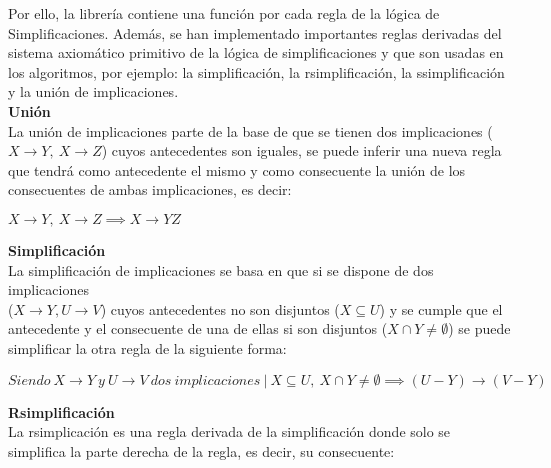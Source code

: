 


Por ello, la librer\'ia contiene una funci\'on por cada regla de la l\'ogica de Simplificaciones. Adem\'as, se han implementado importantes reglas derivadas del sistema axiom\'atico primitivo de la l\'ogica de simplificaciones y que son usadas en los algoritmos, por ejemplo: la simplificaci\'on, la rsimplificaci\'on, la ssimplificaci\'on y la uni\'on de implicaciones.\\

\textbf{Uni\'on}\\
La uni\'on de implicaciones parte de la base de que se tienen dos implicaciones (\(X \to Y, \ X \to Z\)) cuyos antecedentes son iguales, se puede inferir una nueva regla que tendr\'a como antecedente el mismo y como consecuente la uni\'on de los consecuentes de ambas implicaciones, es decir:

\begin{center}
    \(X \to Y, \ X \to Z \implies X \to YZ \)
\end{center}


\bigskip
\textbf{Simplificaci\'on}\\
La simplificaci\'on de implicaciones se basa en que si se dispone de dos implicaciones \\ (\(X \to Y , U \to V\)) cuyos antecedentes no son disjuntos (\(X \subseteq U\)) y se cumple que el antecedente y el consecuente de una de ellas si son disjuntos (\(X \cap Y \neq \emptyset\)) se puede simplificar la otra regla de la siguiente forma:

\begin{center}
    \(Siendo \ X \to Y \ y \ U\to V \ dos \ implicaciones \ | \ X \subseteq U, \ X \cap Y \neq \emptyset \implies (U - Y) \to (V - Y)\)
\end{center}


\bigskip
\textbf{Rsimplificaci\'on}\\
La rsimplicaci\'on es una regla derivada de la simplificaci\'on donde solo se simplifica la parte derecha de la regla, es decir, su consecuente:

